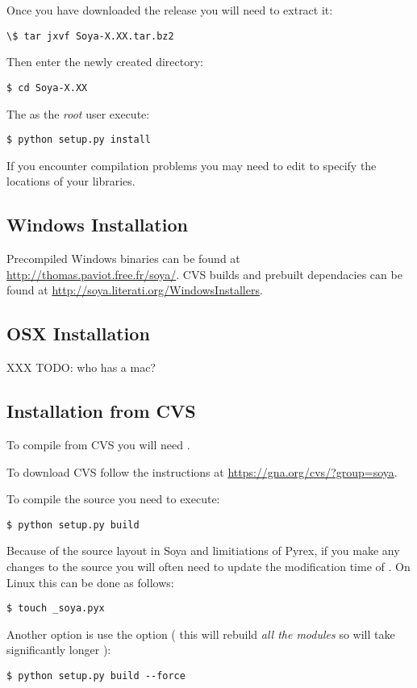 Once you have downloaded the release you will need to extract it:
\begin{verbatim}
\$ tar jxvf Soya-X.XX.tar.bz2
\end{verbatim}

Then enter the newly created directory:
\begin{verbatim}
$ cd Soya-X.XX
\end{verbatim}

The as the \emph{root} user execute:
\begin{verbatim}
$ python setup.py install
\end{verbatim}

If you encounter compilation problems you may need to edit 
to specify the locations of your libraries.

\subsection{Windows Installation}
Precompiled Windows binaries can be found at 
\url{http://thomas.paviot.free.fr/soya/}.
CVS builds and prebuilt dependacies can be found at 
\url{http://soya.literati.org/WindowsInstallers}.

\subsection{OSX Installation}
XXX TODO: who has a mac?

\subsection{Installation from CVS}
To compile from CVS you will need 
.

To download CVS follow the instructions at 
\url{https://gna.org/cvs/?group=soya}.

To compile the source you need to execute:
\begin{verbatim}
$ python setup.py build
\end{verbatim}

Because of the source layout in Soya and limitiations of Pyrex, if 
you make any changes to the source you will often need to update the 
modification time of . On Linux this can be done as 
follows:
\begin{verbatim}
$ touch _soya.pyx
\end{verbatim}

Another option is use the  option ( this will rebuild
\emph{all the modules} so will take significantly longer ):
\begin{verbatim}
$ python setup.py build --force
\end{verbatim}

